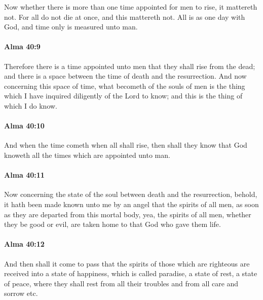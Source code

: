 			Now whether there is more than one time appointed for men to rise,
			it mattereth not.
			For all do not die at once,
			and this mattereth not.
			All is as one day with God,
			and time only is measured unto man.

		\paragraph{Alma 40:9} %
			\label{ALMA-40-9}

			Therefore there is a time appointed unto men that they shall rise from the dead;
			and there is a space between the time of death and the resurrection.
			And now concerning this space of time,
			what becometh of the souls of men is the thing
			which I have inquired diligently of the Lord to know;
			and this is the thing of which I do know.

		\paragraph{Alma 40:10} %
			\label{ALMA-40-10}

			And when the time cometh when all shall rise,
			then shall they know that God knoweth all the times
			which are appointed unto man.

		\paragraph{Alma 40:11} %
			\label{ALMA-40-11}

			Now concerning the state of the soul between death and the resurrection,
			behold, it hath been made known unto me by an angel
			that the spirits of all men, as soon as they are departed from this mortal body,
			yea, the spirits of all men, whether they be good or evil,
			are taken home to that God who gave them life.

		\paragraph{Alma 40:12} %
			\label{ALMA-40-12}

			And then shall it come to pass that
			the spirits of those which are righteous are received into a state of happiness,
			which is called paradise, a state of rest, a state of peace,
			where they shall rest from all their troubles and from all care and sorrow etc.

